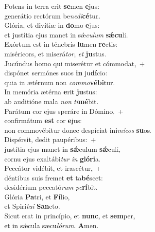 \evenverse Potens in terra erit \textbf{se}men \textbf{e}jus:~\*\\
\evenverse generátio rectórum be\textit{ne}\textit{di}\textbf{cé}tur.\\
\oddverse Glória, et divítiæ in \textbf{do}mo \textbf{e}jus:~\*\\
\oddverse et justítia ejus manet in sǽ\textit{cu}\textit{lum} \textbf{sǽ}\textbf{cu}li.\\
\evenverse Exórtum est in ténebris \textbf{lu}men \textbf{re}ctis:~\*\\
\evenverse miséricors, et miserá\textit{tor}, \textit{et} \textbf{ju}stus.\\
\oddverse Jucúndus homo qui miserétur et cómmodat,~+\\
\oddverse  dispónet sermónes suos \textbf{in} ju\textbf{dí}cio:~\*\\
\oddverse quia in ætérnum non \textit{com}\textit{mo}\textbf{vé}\textbf{bi}tur.\\
\evenverse In memória ætérna \textbf{e}rit \textbf{ju}stus:~\*\\
\evenverse ab auditióne mala \textit{non} \textit{ti}\textbf{mé}bit.\\
\oddverse Parátum cor ejus speráre in Dómino,~+\\
\oddverse  confirmátum \textbf{est} cor \textbf{e}jus:~\*\\
\oddverse non commovébitur donec despíciat ini\textit{mí}\textit{cos} \textbf{su}os.\\
\evenverse Dispérsit, dedit paupéribus:~+\\
\evenverse  justítia ejus manet in \textbf{sǽ}culum \textbf{sǽ}culi,~\*\\
\evenverse cornu ejus exaltábi\textit{tur} \textit{in} \textbf{gló}\textbf{ri}a.\\
\oddverse Peccátor vidébit, et irascétur,~+\\
\oddverse  déntibus suis fremet \textbf{et} ta\textbf{bé}scet:~\*\\
\oddverse desidérium peccató\textit{rum} \textit{pe}\textbf{rí}bit.\\
\evenverse Glória \textbf{Pa}tri, et \textbf{Fí}lio,~\*\\
\evenverse et Spirí\textit{tu}\textit{i} \textbf{San}cto.\\
\oddverse Sicut erat in princípio, et \textbf{nunc}, et \textbf{sem}per,~\*\\
\oddverse et in sǽcula sæcu\textit{ló}\textit{rum}. \textbf{A}men.\\
